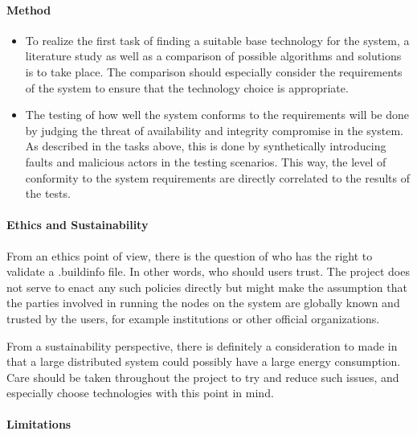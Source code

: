 \documentclass{article}
\begin{document}
\paragraph{Method}
\begin{itemize}
	\item To realize the first task of finding a suitable base technology for the system, a literature study as well as a comparison of possible algorithms and solutions is to take place. The comparison should especially consider the requirements of the system to ensure that the technology choice is appropriate.
	\item The testing of how well the system conforms to the requirements will be done by judging the threat of availability and integrity compromise in the system. As described in the tasks above, this is done by synthetically introducing faults and malicious actors in the testing scenarios. This way, the level of conformity to the system requirements are directly correlated to the results of the tests.
\end{itemize}



\paragraph{Ethics and Sustainability} From an ethics point of view, there is the question of who has the right to validate a .buildinfo file. In other words, who should users trust. The project does not serve to enact any such policies directly but might make the assumption that the parties involved in running the nodes on the system are globally known and trusted by the users, for example institutions or other official organizations. 

From a sustainability perspective, there is definitely a consideration to made in that a large distributed system could possibly have a large energy consumption. Care should be taken throughout the project to try and reduce such issues, and especially choose technologies with this point in mind. 

\paragraph{Limitations}
\end{document}
